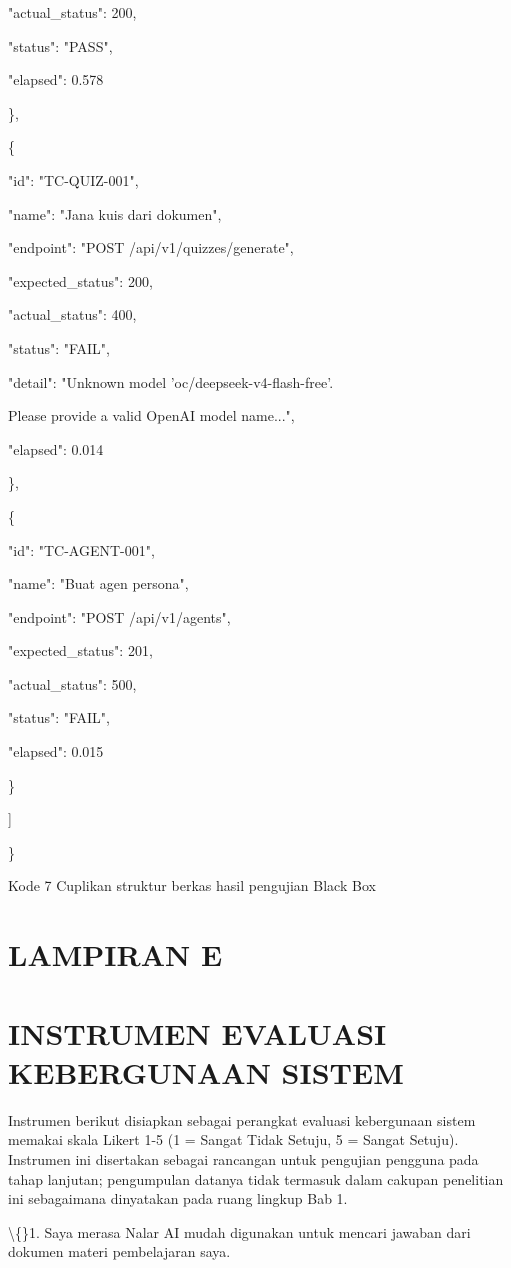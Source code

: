 \documentclass[12pt,a4paper]{article}
\begin{document}
"actual\_status": 200,

"status": "PASS",

"elapsed": 0.578

\},

\{

"id": "TC-QUIZ-001",

"name": "Jana kuis dari dokumen",

"endpoint": "POST /api/v1/quizzes/generate",

"expected\_status": 200,

"actual\_status": 400,

"status": "FAIL",

"detail": "Unknown model 'oc/deepseek-v4-flash-free'.

Please provide a valid OpenAI model name...",

"elapsed": 0.014

\},

\{

"id": "TC-AGENT-001",

"name": "Buat agen persona",

"endpoint": "POST /api/v1/agents",

"expected\_status": 201,

"actual\_status": 500,

"status": "FAIL",

"elapsed": 0.015

\}

{]}

\}

Kode 7	Cuplikan struktur berkas hasil pengujian Black Box

\section*{LAMPIRAN E}
\section*{INSTRUMEN EVALUASI KEBERGUNAAN SISTEM}
Instrumen berikut disiapkan sebagai perangkat evaluasi kebergunaan sistem memakai skala Likert 1-5 (1 = Sangat Tidak Setuju, 5 = Sangat Setuju). Instrumen ini disertakan sebagai rancangan untuk pengujian pengguna pada tahap lanjutan; pengumpulan datanya tidak termasuk dalam cakupan penelitian ini sebagaimana dinyatakan pada ruang lingkup Bab 1.

\textbackslash\{\}1. Saya merasa Nalar AI mudah digunakan untuk mencari jawaban dari dokumen materi pembelajaran saya.
\end{document}

